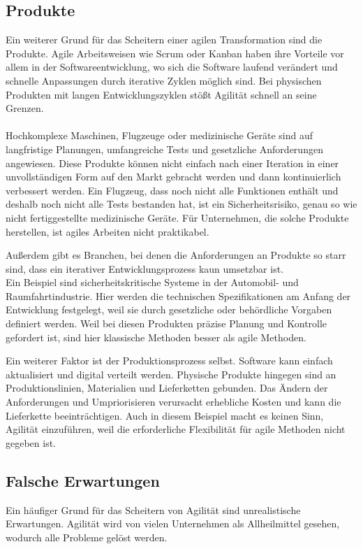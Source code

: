\documentclass[ngerman]{seminarvorlage}
\begin{document}
\subsection{Produkte}

Ein weiterer Grund für das Scheitern einer agilen Transformation sind die Produkte. Agile Arbeitsweisen wie Scrum oder Kanban haben ihre Vorteile vor allem in der Softwareentwicklung, wo sich die Software laufend verändert und schnelle Anpassungen durch iterative Zyklen möglich sind. Bei physischen Produkten mit langen Entwicklungszyklen stößt Agilität schnell an seine Grenzen\cite{Simons.2021}.\\\\
Hochkomplexe Maschinen, Flugzeuge oder medizinische Geräte sind auf langfristige Planungen, umfangreiche Tests und gesetzliche Anforderungen angewiesen. Diese Produkte können nicht einfach nach einer Iteration in einer unvollständigen Form auf den Markt gebracht werden und dann kontinuierlich verbessert werden. Ein Flugzeug, dass noch nicht alle Funktionen enthält und deshalb noch nicht alle Tests bestanden hat, ist ein Sicherheitsrisiko, genau so wie nicht fertiggestellte medizinische Geräte. Für Unternehmen, die solche Produkte herstellen, ist agiles Arbeiten nicht praktikabel.

Außerdem gibt es Branchen, bei denen die Anforderungen an Produkte so starr sind, dass ein iterativer Entwicklungsprozess kaun umsetzbar ist.\\ Ein Beispiel sind sicherheitskritische Systeme in der Automobil- und Raumfahrtindustrie. Hier werden die technischen Spezifikationen am Anfang der Entwicklung festgelegt, weil sie durch gesetzliche oder behördliche Vorgaben definiert werden. Weil bei diesen Produkten präzise Planung und Kontrolle gefordert ist, sind hier klassische Methoden besser als agile Methoden.

Ein weiterer Faktor ist der Produktionsprozess selbst. Software kann einfach aktualisiert und digital verteilt werden. Physische Produkte hingegen sind an Produktionslinien, Materialien und Lieferketten gebunden. Das Ändern der Anforderungen und Umpriorisieren verursacht erhebliche Kosten und kann die Lieferkette beeinträchtigen. Auch in diesem Beispiel macht es keinen Sinn, Agilität einzuführen, weil die erforderliche Flexibilität für agile Methoden nicht gegeben ist.

\subsection{Falsche Erwartungen}
Ein häufiger Grund für das Scheitern von Agilität sind unrealistische Erwartungen. Agilität wird von vielen Unternehmen als Allheilmittel gesehen, wodurch alle Probleme gelöst werden.\cite{mgmRedaktion.2019}\\
\end{document}
